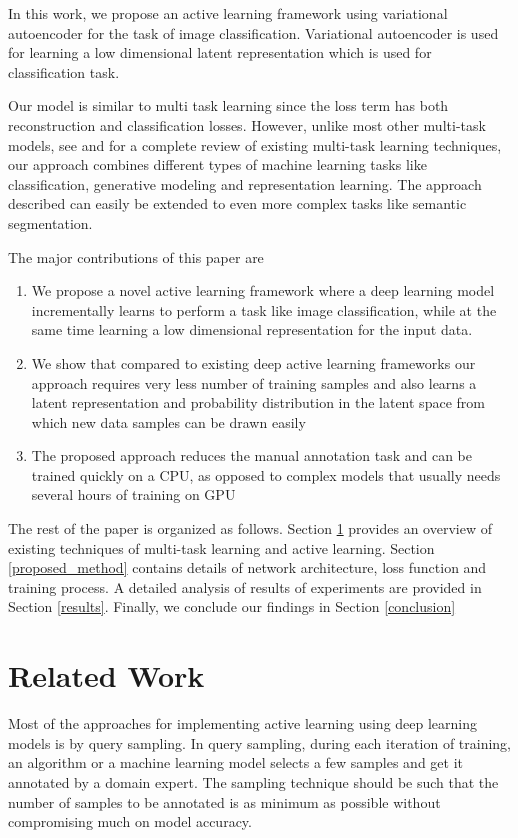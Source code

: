 \documentclass{uai2021} %
\begin{document}
In this work, we propose an active learning framework using variational autoencoder for the task of  image classification.
Variational autoencoder is used for learning a low dimensional latent representation which is used for classification task.


Our model is similar to multi task learning since the loss term has both reconstruction and classification losses.
However, unlike most other multi-task models, see \cite{ruder2017overview} and \cite{crawshaw2020multi} for a complete review of existing multi-task learning techniques, our approach combines  different types of machine learning tasks like classification, generative modeling and representation learning.
The approach described can easily be extended to even more complex tasks like semantic segmentation.

The major contributions of this paper are
\begin{enumerate}
    \item We propose a novel active learning framework where a  deep learning model incrementally learns to perform a task like image classification, while at the same time learning a low dimensional representation for the input data.
    \item We show that compared to existing deep active learning frameworks our approach requires very less number of training samples and also learns a latent representation and  probability distribution in the latent space from which new data samples can be drawn easily
    \item The proposed approach reduces the manual annotation task and can be trained quickly on a CPU, as opposed to complex models that usually needs several hours of training on GPU
\end{enumerate}

The rest of the paper is organized as follows.
Section \ref{related_works} provides an overview of existing techniques of multi-task learning and active learning.
Section \ref{proposed_method} contains details of network architecture, loss function and training process.
A detailed analysis of results of experiments are provided in Section \ref{results}.
Finally, we conclude our findings in Section \ref{conclusion}

\section{Related Work} \label{related_works}
Most of the approaches for implementing active learning using deep learning models is by query sampling.
In query sampling, during each iteration of training, an algorithm or a machine learning model selects a few samples and get it annotated by a domain expert\cite{sinha2019variational}\cite{sener2017active}.
The sampling technique should be such that the number of samples to be annotated is as minimum as possible without compromising much on model accuracy.
\end{document}

